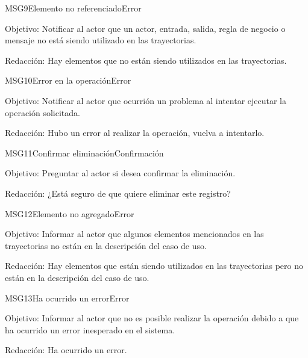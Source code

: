 \begin{mensaje}{MSG9}{Elemento no referenciado}{Error}
    \item[Objetivo:] Notificar al actor que un actor, entrada, salida, regla de negocio o mensaje no está siendo utilizado en las trayectorias.
    \item[Redacción:] Hay elementos que no están siendo utilizados en las trayectorias.
\end{mensaje}

\begin{mensaje}{MSG10}{Error en la operación}{Error}
    \item[Objetivo:] Notificar al actor que ocurrión un problema al intentar ejecutar la operación solicitada.
    \item[Redacción:] Hubo un error al realizar la operación, vuelva a intentarlo.
\end{mensaje}

\begin{mensaje}{MSG11}{Confirmar eliminación}{Confirmación}
    \item[Objetivo:] Preguntar al actor si desea confirmar la eliminación.
    \item[Redacción:] ¿Está seguro de que quiere eliminar este registro?
\end{mensaje}

\begin{mensaje}{MSG12}{Elemento no agregado}{Error}
    \item[Objetivo:] Informar al actor que algunos elementos mencionados en las trayectorias no están en la descripción del caso de uso.
    \item[Redacción:] Hay elementos que están siendo utilizados en las trayectorias pero no están en la descripción del caso de uso.
\end{mensaje}
\begin{mensaje}{MSG13}{Ha ocurrido un error}{Error}
    \item[Objetivo:] Informar al actor que no es posible realizar la operación debido a que ha ocurrido un error inesperado en el sistema.
    \item[Redacción:] Ha ocurrido un error.
\end{mensaje}
	
